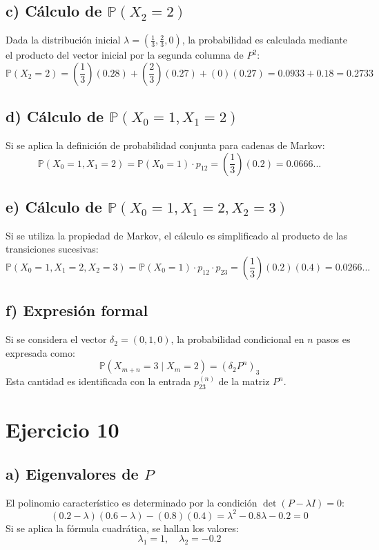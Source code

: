 \documentclass[letterpaper, 12pt]{article}
\begin{document}
    \subsection*{c) Cálculo de $\mathbb{P}(X_2 = 2)$}
    Dada la distribución inicial $\lambda = (\frac{1}{3}, \frac{2}{3}, 0)$, la probabilidad es calculada mediante el producto del vector inicial por la segunda columna de $P^2$:
    $$\mathbb{P}(X_2 = 2) = \left(\frac{1}{3}\right)(0.28) + \left(\frac{2}{3}\right)(0.27) + (0)(0.27) = 0.0933 + 0.18 = 0.2733$$

    \subsection*{d) Cálculo de $\mathbb{P}(X_0 = 1, X_1 = 2)$}
    Si se aplica la definición de probabilidad conjunta para cadenas de Markov:
    $$\mathbb{P}(X_0 = 1, X_1 = 2) = \mathbb{P}(X_0 = 1) \cdot p_{12} = \left(\frac{1}{3}\right)(0.2) = 0.0666...$$

    \subsection*{e) Cálculo de $\mathbb{P}(X_0 = 1, X_1 = 2, X_2 = 3)$}
    Si se utiliza la propiedad de Markov, el cálculo es simplificado al producto de las transiciones sucesivas:
    $$\mathbb{P}(X_0 = 1, X_1 = 2, X_2 = 3) = \mathbb{P}(X_0 = 1) \cdot p_{12} \cdot p_{23} = \left(\frac{1}{3}\right)(0.2)(0.4) = 0.0266...$$

    \subsection*{f) Expresión formal}
    Si se considera el vector $\delta_2 = (0, 1, 0)$, la probabilidad condicional en $n$ pasos es expresada como:
    $$\mathbb{P}(X_{m+n} = 3 \mid X_m = 2) = (\delta_2 P^n)_3$$
    Esta cantidad es identificada con la entrada $p_{23}^{(n)}$ de la matriz $P^n$.
    \newpage

    \section*{Ejercicio 10}

    \subsection*{a) Eigenvalores de $P$}
    El polinomio característico es determinado por la condición $\det(P - \lambda I) = 0$:
    $$(0.2 - \lambda)(0.6 - \lambda) - (0.8)(0.4) = \lambda^2 - 0.8\lambda - 0.2 = 0$$
    Si se aplica la fórmula cuadrática, se hallan los valores:
    $$\lambda_1 = 1, \quad \lambda_2 = -0.2$$
\end{document}
